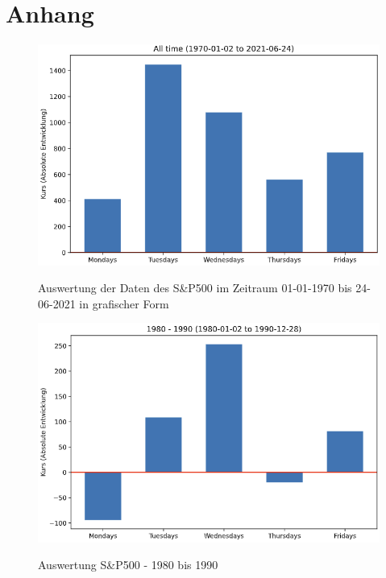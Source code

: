 \section*{Anhang}

\anhangsverzeichnis


\begin{figure}[hbt]
    \centering
    \begin{minipage}[t]{.8\textwidth}
        \caption[]{Auswertung der Daten des S\&P500 im Zeitraum 01-01-1970 bis 24-06-2021 in grafischer Form}
        \includegraphics[width=1\textwidth]{img/Auswertung_SP500_1970-2021.PNG}\\
        \label{fig:auswertung_sp500_graph}
    \end{minipage}
\end{figure}

\begin{figure}[!htb]
    \centering
    \begin{minipage}[t]{0.8\textwidth}
        \caption{Auswertung S\&P500 - 1980 bis 1990}
        \includegraphics[width=1\textwidth]{img/Auswertung_SP500_1980-1990.PNG}\\
        \label{fig:ausw_sp500_1980_1990}
    \end{minipage}
\end{figure}

